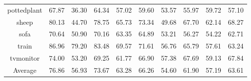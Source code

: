 \begin{sidewaystable}
\begin{tabular}{|c|c| p{2cm}| p{2cm}|c|c|c|c|c|c|}
pottedplant & 67.87 & 36.30 & 64.34 & 57.02 & 59.60 & 53.57 & 55.97 & 59.72 & 57.10 \\  [1ex]
sheep & 80.13 & 44.70 & 78.75 & 65.73 & 73.34 & 49.68 & 67.70 & 62.14 & 68.27 \\  [1ex]
sofa & 70.64 & 50.90 & 70.16 & 63.35 & 64.89 & 53.21 & 56.27 & 54.22 & 62.71 \\  [1ex]
train & 86.96 & 79.20 & 83.48 & 69.57 & 71.61 & 56.76 & 65.79 & 57.61 & 63.24 \\  [1ex]
tvmonitor & 74.00 & 53.20 & 69.25 & 61.77 & 66.90 & 57.38 & 67.69 & 59.13 & 67.84 \\  [1ex] \hline
Average  & 76.86 & 56.93 & 73.67 & 63.28 & 66.26 & 54.60 & 61.90 & 57.19 & 63.61 \\  [1ex]

\hline %
\end{tabular}
\label{table:PASCALPrecision} %
\end{sidewaystable}


